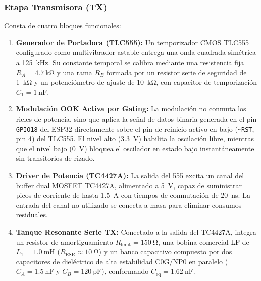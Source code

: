 \subsubsection{Etapa Transmisora (TX)}
Consta de cuatro bloques funcionales:
\begin{enumerate}
    \item \textbf{Generador de Portadora (TLC555):} Un temporizador CMOS TLC555 configurado como multivibrador astable entrega una onda cuadrada simétrica a \SI{125}{\kilo\hertz}. Su constante temporal se calibra mediante una resistencia fija $R_A = \SI{4.7}{\kilo\ohm}$ y una rama $R_B$ formada por un resistor serie de seguridad de \SI{1}{\kilo\ohm} y un potenciómetro de ajuste de \SI{10}{\kilo\ohm}, con capacitor de temporización $C_1 = \SI{1}{\nano\farad}$.
    \item \textbf{Modulación OOK Activa por Gating:} La modulación no conmuta los rieles de potencia, sino que aplica la señal de datos binaria generada en el pin \texttt{GPIO18} del ESP32 directamente sobre el pin de reinicio activo en bajo (\texttt{\textasciitilde RST}, pin 4) del TLC555. El nivel alto (\SI{3.3}{\volt}) habilita la oscilación libre, mientras que el nivel bajo (\SI{0}{\volt}) bloquea el oscilador en estado bajo instantáneamente sin transitorios de rizado.
    \item \textbf{Driver de Potencia (TC4427A):} La salida del 555 excita un canal del buffer dual MOSFET TC4427A, alimentado a \SI{5}{\volt}, capaz de suministrar picos de corriente de hasta \SI{1.5}{\ampere} con tiempos de conmutación de \SI{20}{\nano\second}. La entrada del canal no utilizado se conecta a masa para eliminar consumos residuales.
    \item \textbf{Tanque Resonante Serie TX:} Conectado a la salida del TC4427A, integra un resistor de amortiguamiento $R_{\text{limit}} = \SI{150}{\ohm}$, una bobina comercial LF de $L_1 = \SI{1.0}{\milli\henry}$ ($R_{\text{ESR}} \approx \SI{10}{\ohm}$) y un banco capacitivo compuesto por dos capacitores de dieléctrico de alta estabilidad C0G/NP0 en paralelo ($C_A = \SI{1.5}{\nano\farad}$ y $C_B = \SI{120}{\pico\farad}$), conformando $C_{\text{eq}} = \SI{1.62}{\nano\farad}$.
\end{enumerate}

